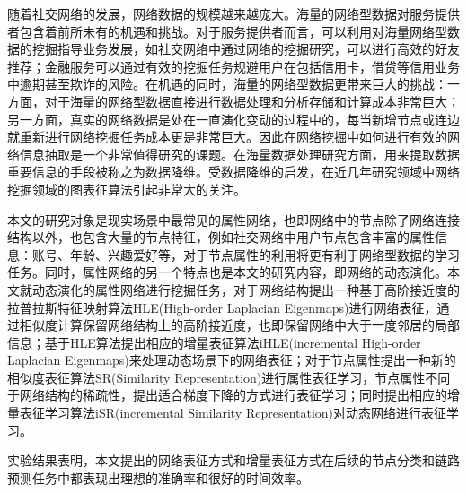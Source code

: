 随着社交网络的发展，网络数据的规模越来越庞大。海量的网络型数据对服务提供者包含着前所未有的机遇和挑战。对于服务提供者而言，可以利用对海量网络型数据的挖掘指导业务发展，如社交网络中通过网络的挖掘研究，可以进行高效的好友推荐；金融服务可以通过有效的挖掘任务规避用户在包括信用卡，借贷等信用业务中逾期甚至欺诈的风险。在机遇的同时，海量的网络型数据更带来巨大的挑战：一方面，对于海量的网络型数据直接进行数据处理和分析存储和计算成本非常巨大；另一方面，真实的网络数据是处在一直演化变动的过程中的，每当新增节点或连边就重新进行网络挖掘任务成本更是非常巨大。因此在网络挖掘中如何进行有效的网络信息抽取是一个非常值得研究的课题。在海量数据处理研究方面，用来提取数据重要信息的手段被称之为数据降维。受数据降维的启发，在近几年研究领域中网络挖掘领域的图表征算法引起非常大的关注。

本文的研究对象是现实场景中最常见的属性网络，也即网络中的节点除了网络连接结构以外，也包含大量的节点特征，例如社交网络中用户节点包含丰富的属性信息：账号、年龄、兴趣爱好等，对于节点属性的利用将更有利于网络型数据的学习任务。同时，属性网络的另一个特点也是本文的研究内容，即网络的动态演化。本文就动态演化的属性网络进行挖掘任务，对于网络结构提出一种基于高阶接近度的拉普拉斯特征映射算法HLE(High-order Laplacian Eigenmaps)进行网络表征，通过相似度计算保留网络结构上的高阶接近度，也即保留网络中大于一度邻居的局部信息；基于HLE算法提出相应的增量表征算法iHLE(incremental High-order Laplacian Eigenmaps)来处理动态场景下的网络表征；对于节点属性提出一种新的相似度表征算法SR(Similarity Representation)进行属性表征学习，节点属性不同于网络结构的稀疏性，提出适合梯度下降的方式进行表征学习；同时提出相应的增量表征学习算法iSR(incremental Similarity Representation)对动态网络进行表征学习。

实验结果表明，本文提出的网络表征方式和增量表征方式在后续的节点分类和链路预测任务中都表现出理想的准确率和很好的时间效率。